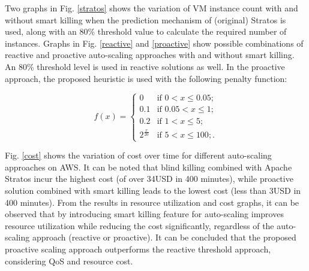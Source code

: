 Two graphs in Fig. \ref{stratos} shows the variation of VM instance count with and without smart killing when the prediction mechanism of (original) Stratos is used, along with an 80\% threshold value to calculate the required number of instances. Graphs in Fig. \ref{reactive} and \ref{proactive} show possible combinations of reactive and proactive auto-scaling approaches with and without smart killing. An 80\% threshold level is used in reactive solutions as well. In the proactive approach, the proposed heuristic is used with the following penalty function:

$$f(x) = \begin{cases} 
0 & \text{if $0 < x \le 0.05$}; \\
0.1 & \text{if $0.05 < x \le 1$}; \\
0.2 & \text{if $1 < x \le 5$};\\
2^{\frac{x}{20}} & \text{if $5 < x \le 100$};.\end{cases} $$

Fig. \ref{cost} shows the variation of cost over time for different auto-scaling approaches on AWS. It can be noted that blind killing combined with Apache Stratos incur the highest cost (of over 34USD in 400 minutes), while proactive solution combined with smart killing leads to the lowest cost (less than 3USD in 400 minutes). From the results in resource utilization and cost graphs, it can be observed that by introducing smart killing feature for auto-scaling improves resource utilization while reducing the cost significantly, regardless of the auto-scaling approach (reactive or proactive). It can be concluded that the proposed proactive scaling approach outperforms the reactive threshold approach, considering QoS and resource cost.